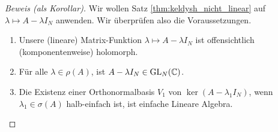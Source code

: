 \begin{proof}[Beweis (als Korollar)]

    Wir wollen Satz \ref{thm:keldysh_nicht_linear} auf $\lambda \mapsto A - \lambda I_N$ anwenden.
    Wir überprüfen also die Voraussetzungen.

    \begin{enumerate}[label = \arabic*.]

        \item Unsere (lineare) Matrix-Funktion $\lambda \mapsto A - \lambda I_N$ ist offensichtlich (komponentenweise) holomorph.

        \item Für alle $\lambda \in \rho(A)$, ist $A - \lambda I_N \in \operatorname{GL}_N(\mathbb{C})$.

        \item Die Existenz einer Orthonormalbasis $V_1$ von $\ker (A - \lambda_1 I_N)$, wenn $\lambda_1 \in \sigma(A)$ halb-einfach ist, ist einfache Lineare Algebra.

        \begin{comment}

            Seien $\lambda_2, \dots, \lambda_k$ die restlichen (paarweise verschiedenen) Eigenwerte von $A$.
            Seien $L_n^\mathrm{geo}$ und $L_n^\mathrm{alg}$ die geometrische bzw. algebraische Vielfachheit von $\lambda_n$ für $n = 2, \dots, k$.
            Betrachte die Jordan Normalform von $A$.


\end{comment}
\end{enumerate}
\end{proof}
